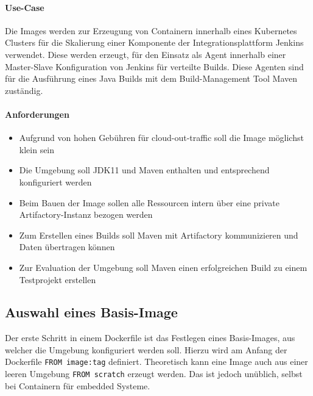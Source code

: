 \paragraph{Use-Case}
Die Images werden zur Erzeugung von Containern innerhalb eines Kubernetes Clusters für die Skalierung einer Komponente der Integrationsplattform Jenkins verwendet. Diese werden erzeugt, für den Einsatz als Agent innerhalb einer Master-Slave Konfiguration von Jenkins für verteilte Builds. Diese Agenten sind für die Ausführung eines Java Builds mit dem Build-Management Tool Maven zuständig.

\paragraph{Anforderungen}
\begin{itemize}
    \item Aufgrund von hohen Gebühren für cloud-out-traffic soll die Image möglichst klein sein
    \item Die Umgebung soll \ac{JDK11} und Maven enthalten und entsprechend konfiguriert werden
    \item Beim Bauen der Image sollen alle Ressourcen intern über eine private Artifactory-Instanz bezogen werden
    \item Zum Erstellen eines Builds soll Maven mit Artifactory kommunizieren und Daten übertragen können
    \item Zur Evaluation der Umgebung soll Maven einen erfolgreichen Build zu einem Testprojekt erstellen
\end{itemize}



\subsection{Auswahl eines Basis-Image}
Der erste Schritt in einem Dockerfile ist das Festlegen eines Basis-Images, aus welcher die Umgebung konfiguriert werden soll. Hierzu wird am Anfang der Dockerfile \lstinline{FROM image:tag} definiert. Theoretisch kann eine Image auch aus einer leeren Umgebung \lstinline{FROM scratch} erzeugt werden. Das ist jedoch unüblich, selbst bei Containern für embedded Systeme.

